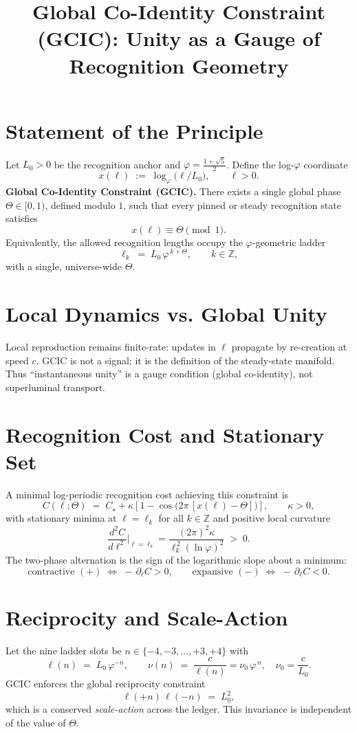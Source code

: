 \documentclass[11pt]{article}
\title{Global Co-Identity Constraint (GCIC): Unity as a Gauge of Recognition Geometry}
\author{}
\date{}
\begin{document}
\maketitle

\section*{Statement of the Principle}
Let $L_0>0$ be the recognition anchor and $\varphi=\tfrac{1+\sqrt{5}}{2}$. Define the log-$\varphi$ coordinate
\[
x(\ell)\;:=\;\log_{\varphi}\!\big(\ell/L_0\big),\qquad \ell>0.
\]
\textbf{Global Co-Identity Constraint (GCIC).} There exists a single global phase $\Theta\in[0,1)$, defined modulo $1$, such that every pinned or steady recognition state satisfies
\[
x(\ell)\equiv \Theta \pmod{1}.
\]
Equivalently, the allowed recognition lengths occupy the $\varphi$-geometric ladder
\[
\ell_k\;=\;L_0\,\varphi^{\,k+\Theta},\qquad k\in\mathbb{Z},
\]
with a single, universe-wide $\Theta$.

\section*{Local Dynamics vs. Global Unity}
Local reproduction remains finite-rate: updates in $\ell$ propagate by re-creation at speed $c$. GCIC is not a signal; it is the definition of the steady-state manifold. Thus ``instantaneous unity'' is a gauge condition (global co-identity), not superluminal transport.

\section*{Recognition Cost and Stationary Set}
A minimal log-periodic recognition cost achieving this constraint is
\[
C(\ell;\Theta)\;=\;C_\star+\kappa\!\left[1-\cos\!\big(2\pi\,[x(\ell)-\Theta]\big)\right],\qquad \kappa>0,
\]
with stationary minima at $\ell=\ell_k$ for all $k\in\mathbb{Z}$ and positive local curvature
\[
\frac{d^2 C}{d\ell^2}\Big|_{\ell=\ell_k}
=\frac{(2\pi)^2\kappa}{\ell_k^{\,2}(\ln\varphi)^2}\;>\;0.
\]
The two-phase alternation is the sign of the logarithmic slope about a minimum:
\[
\text{contractive }(+)\;\Longleftrightarrow\; -\,\partial_\ell C>0,\qquad
\text{expansive }(-)\;\Longleftrightarrow\; -\,\partial_\ell C<0.
\]

\section*{Reciprocity and Scale-Action}
Let the nine ladder slots be $n\in\{-4,-3,\dots,+3,+4\}$ with
\[
\ell(n)\;=\;L_0\,\varphi^{-n},\qquad \nu(n)\;=\;\frac{c}{\ell(n)}=\nu_0\,\varphi^{\,n},\quad \nu_0=\frac{c}{L_0}.
\]
GCIC enforces the global reciprocity constraint
\[
\ell(+n)\,\ell(-n)\;=\;L_0^2,
\]
which is a conserved \emph{scale-action} across the ledger. This invariance is independent of the value of $\Theta$.
\end{document}
